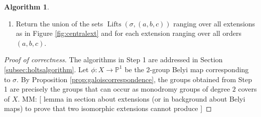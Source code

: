 \documentclass{dcthesis}
\newcommand{\PP}{\mathbb P}
\newcommand{\ZZ}{\mathbb Z}
\newcommand{\mm}[1]{{\color{blue} \sf MM: [#1]}}
\newcommand{\wt}[1]{\widetilde{#1}}
\DeclareMathOperator{\Lifts}{Lifts}
\DeclareMathOperator{\order}{order}
\theoremstyle{definition}
\newtheorem{alg}[prop]{Algorithm}
\theoremstyle{remark}
\numberwithin{equation}{section}
\numberwithin{figure}{section}
\begin{document}
{{\begin{alg}
\begin{enumerate}
\begin{enumerate}
\begin{equation}
                \{
                  \wt{\sigma}\colonequals(\wt{\sigma}_0, \wt{\sigma}_1, \wt{\sigma}_\infty) :
                  \wt{\sigma}_s\in\pi^{-1}(\sigma_s)\text{ for }
                  s\in\{0,1,\infty\}
                \}
              \end{equation}
              and let $\Lifts(\sigma)$ denote the set of such $\wt{\sigma}$
              with the property that $\wt{\sigma}_\infty\wt{\sigma}_1\wt{\sigma}_0 = 1$
              and $\langle\wt{\sigma}\rangle = \wt{G}$.
            \item
              For each $\wt{\sigma}\in\Lifts(\sigma)$ compute
              $\order(\wt{\sigma})\colonequals(\order(\wt{\sigma}_0), \order(\wt{\sigma}_1), \order(\wt{\sigma}_\infty))\in\ZZ^3$
              and sort $\Lifts(\sigma)$ according to $\order(\wt{\sigma})$.
              Let
              \begin{equation}
                \label{eqn:liftsorders}
                \Lifts(\sigma,(a,b,c))\colonequals
                \{
                  \wt{\sigma}\in\Lifts(\sigma) :
                  \order(\wt{\sigma}) = (a,b,c)
                \}.
              \end{equation}
            \item
              For each set of triples $\Lifts(\sigma,(a,b,c))$
              remove simultaneously conjugate triples so that
              $\Lifts(\sigma,(a,b,c))$ has exactly one representative
              from each simultaneous conjugacy class.
              \mm{TODO: reword}
          \end{enumerate}
        \item
          Return the union of the sets $\Lifts(\sigma,(a,b,c))$
          ranging over all extensions as in Figure
          \ref{fig:centralext}
          and for each extension ranging over all orders
          $(a,b,c)$.
      \end{enumerate}
    \end{alg}
    \begin{proof}[Proof of correctness]
      The algorithms in Step 1 are addressed in Section \ref{subsec:holtsalgorithm}.
      Let $\phi:X\to\PP^1$ be the $2$-group Belyi map corresponding to $\sigma$.
      By Proposition \ref{prop:galoiscorrespondence},
      the groups obtained from Step 1 are precisely the
      groups that can occur as monodromy groups of degree $2$ covers of $X$.
      \mm{
        lemma in section about extensions
        (or in background about Belyi maps)
        to prove
        that two isomorphic extensions cannot produce
}
\end{proof}}}
\end{document}
